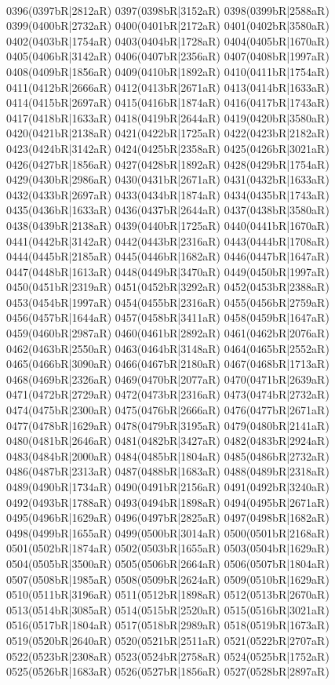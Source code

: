 \\0396(0397bR|2812aR) 0397(0398bR|3152aR) 0398(0399bR|2588aR) 0399(0400bR|2732aR) 0400(0401bR|2172aR) 0401(0402bR|3580aR) 0402(0403bR|1754aR) 0403(0404bR|1728aR) 0404(0405bR|1670aR) \\0405(0406bR|3142aR) 0406(0407bR|2356aR) 0407(0408bR|1997aR) 0408(0409bR|1856aR) 0409(0410bR|1892aR) 0410(0411bR|1754aR) 0411(0412bR|2666aR) 0412(0413bR|2671aR) 0413(0414bR|1633aR) \\0414(0415bR|2697aR) 0415(0416bR|1874aR) 0416(0417bR|1743aR) 0417(0418bR|1633aR) 0418(0419bR|2644aR) 0419(0420bR|3580aR) 0420(0421bR|2138aR) 0421(0422bR|1725aR) 0422(0423bR|2182aR) \\0423(0424bR|3142aR) 0424(0425bR|2358aR) 0425(0426bR|3021aR) 0426(0427bR|1856aR) 0427(0428bR|1892aR) 0428(0429bR|1754aR) 0429(0430bR|2986aR) 0430(0431bR|2671aR) 0431(0432bR|1633aR) \\0432(0433bR|2697aR) 0433(0434bR|1874aR) 0434(0435bR|1743aR) 0435(0436bR|1633aR) 0436(0437bR|2644aR) 0437(0438bR|3580aR) 0438(0439bR|2138aR) 0439(0440bR|1725aR) 0440(0441bR|1670aR) \\0441(0442bR|3142aR) 0442(0443bR|2316aR) 0443(0444bR|1708aR) 0444(0445bR|2185aR) 0445(0446bR|1682aR) 0446(0447bR|1647aR) 0447(0448bR|1613aR) 0448(0449bR|3470aR) 0449(0450bR|1997aR) \\0450(0451bR|2319aR) 0451(0452bR|3292aR) 0452(0453bR|2388aR) 0453(0454bR|1997aR) 0454(0455bR|2316aR) 0455(0456bR|2759aR) 0456(0457bR|1644aR) 0457(0458bR|3411aR) 0458(0459bR|1647aR) \\0459(0460bR|2987aR) 0460(0461bR|2892aR) 0461(0462bR|2076aR) 0462(0463bR|2550aR) 0463(0464bR|3148aR) 0464(0465bR|2552aR) 0465(0466bR|3090aR) 0466(0467bR|2180aR) 0467(0468bR|1713aR) \\0468(0469bR|2326aR) 0469(0470bR|2077aR) 0470(0471bR|2639aR) 0471(0472bR|2729aR) 0472(0473bR|2316aR) 0473(0474bR|2732aR) 0474(0475bR|2300aR) 0475(0476bR|2666aR) 0476(0477bR|2671aR) \\0477(0478bR|1629aR) 0478(0479bR|3195aR) 0479(0480bR|2141aR) 0480(0481bR|2646aR) 0481(0482bR|3427aR) 0482(0483bR|2924aR) 0483(0484bR|2000aR) 0484(0485bR|1804aR) 0485(0486bR|2732aR) \\0486(0487bR|2313aR) 0487(0488bR|1683aR) 0488(0489bR|2318aR) 0489(0490bR|1734aR) 0490(0491bR|2156aR) 0491(0492bR|3240aR) 0492(0493bR|1788aR) 0493(0494bR|1898aR) 0494(0495bR|2671aR) \\0495(0496bR|1629aR) 0496(0497bR|2825aR) 0497(0498bR|1682aR) 0498(0499bR|1655aR) 0499(0500bR|3014aR) 0500(0501bR|2168aR) 0501(0502bR|1874aR) 0502(0503bR|1655aR) 0503(0504bR|1629aR) \\0504(0505bR|3500aR) 0505(0506bR|2664aR) 0506(0507bR|1804aR) 0507(0508bR|1985aR) 0508(0509bR|2624aR) 0509(0510bR|1629aR) 0510(0511bR|3196aR) 0511(0512bR|1898aR) 0512(0513bR|2670aR) \\0513(0514bR|3085aR) 0514(0515bR|2520aR) 0515(0516bR|3021aR) 0516(0517bR|1804aR) 0517(0518bR|2989aR) 0518(0519bR|1673aR) 0519(0520bR|2640aR) 0520(0521bR|2511aR) 0521(0522bR|2707aR) \\0522(0523bR|2308aR) 0523(0524bR|2758aR) 0524(0525bR|1752aR) 0525(0526bR|1683aR) 0526(0527bR|1856aR) 0527(0528bR|2897aR) 